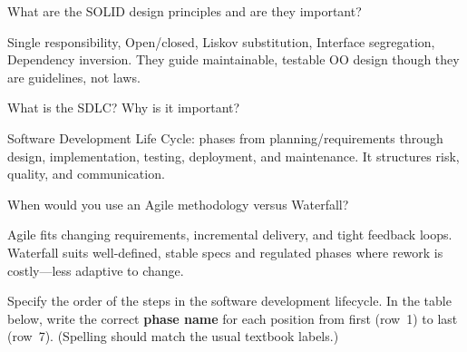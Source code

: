 



\question[4]
What are the SOLID design principles and are they important?
\begin{solutionorbox}[1.55in]
  Single responsibility, Open/closed, Liskov substitution, Interface segregation, Dependency inversion. They guide maintainable, testable OO design though they are guidelines, not laws.
\end{solutionorbox}

\question[4]
What is the SDLC? Why is it important?
\begin{solutionorbox}[1.25in]
  Software Development Life Cycle: phases from planning/requirements through design, implementation, testing, deployment, and maintenance. It structures risk, quality, and communication.
\end{solutionorbox}

\question[4]
When would you use an Agile methodology versus Waterfall?
\begin{solutionorbox}[1.45in]
  Agile fits changing requirements, incremental delivery, and tight feedback loops. Waterfall suits well-defined, stable specs and regulated phases where rework is costly---less adaptive to change.
\end{solutionorbox}

\newpage



\question[4]
Specify the order of the steps in the software development lifecycle. In the table below, write the correct \textbf{phase name} for each position from first (row~1) to last (row~7). (Spelling should match the usual textbook labels.)

